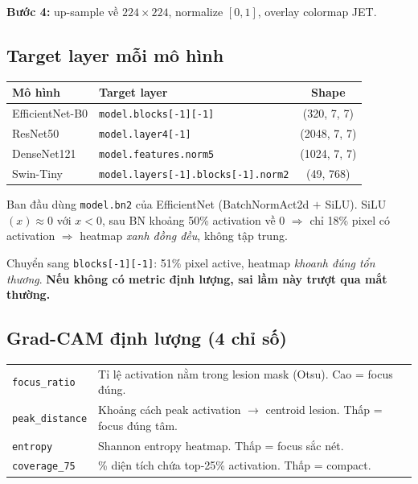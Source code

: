 \documentclass[11pt,a4paper]{article}
\begin{document}
\textbf{Bước 4:} up-sample về $224\times 224$, normalize $[0,1]$, overlay colormap JET.

\subsection{Target layer mỗi mô hình}

\begin{table}[h]
\centering\small
\begin{tabular}{llc}
\toprule
\textbf{Mô hình} & \textbf{Target layer} & \textbf{Shape} \\
\midrule
EfficientNet-B0 & \texttt{model.blocks[-1][-1]}    & (320, 7, 7) \\
ResNet50        & \texttt{model.layer4[-1]}        & (2048, 7, 7) \\
DenseNet121     & \texttt{model.features.norm5}    & (1024, 7, 7) \\
Swin-Tiny       & \texttt{model.layers[-1].blocks[-1].norm2} & (49, 768) \\
\bottomrule
\end{tabular}
\end{table}

\begin{idea}
Ban đầu dùng \texttt{model.bn2} của EfficientNet (BatchNormAct2d $+$ SiLU). SiLU$(x) \approx 0$ với $x < 0$, sau BN khoảng 50\% activation về 0 $\Rightarrow$ chỉ 18\% pixel có activation $\Rightarrow$ heatmap \textit{xanh đồng đều}, không tập trung.

Chuyển sang \texttt{blocks[-1][-1]}: 51\% pixel active, heatmap \textit{khoanh đúng tổn thương}. \textbf{Nếu không có metric định lượng, sai lầm này trượt qua mắt thường.}
\end{idea}

\subsection{Grad-CAM định lượng (4 chỉ số)}

\begin{table}[h]
\centering\small
\begin{tabular}{lp{8cm}}
\toprule
\texttt{focus\_ratio}      & Tỉ lệ activation nằm trong lesion mask (Otsu). Cao = focus đúng. \\
\texttt{peak\_distance}    & Khoảng cách peak activation $\to$ centroid lesion. Thấp = focus đúng tâm. \\
\texttt{entropy}           & Shannon entropy heatmap. Thấp = focus sắc nét. \\
\texttt{coverage\_75}      & \% diện tích chứa top-25\% activation. Thấp = compact. \\
\bottomrule
\end{tabular}
\end{table}
\end{document}
